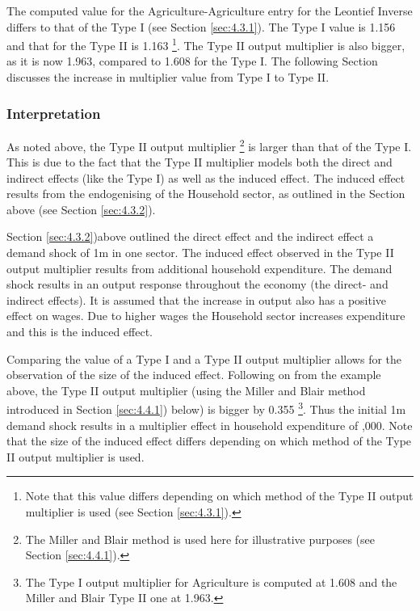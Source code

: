\begin{doublespacing}
\bigskip

The computed value for the Agriculture-Agriculture entry for the Leontief Inverse differs to that of the Type I (see Section \ref{sec:4.3.1}). The Type I value is 1.156 and that for the Type II is 1.163 \footnote{ Note that this value differs depending on which method of the Type II output multiplier is used (see Section \ref{sec:4.3.1}).}. The Type II output multiplier is also bigger, as it is now 1.963, compared to 1.608 for the Type I. The following Section discusses the increase in multiplier value from Type I to Type II.

\subsubsection{Interpretation}

As noted above, the Type II output multiplier \footnote{ The Miller and Blair  method is used here for illustrative purposes (see Section \ref{sec:4.4.1}).} is larger than that of the Type I. This is due to the fact that the Type II multiplier models both the direct and indirect effects (like the Type I) as well as the induced effect. The induced effect results from the endogenising of the Household sector, as outlined in the Section above (see Section \ref{sec:4.3.2}).

\bigskip

Section \ref{sec:4.3.2})above outlined the direct effect and the indirect effect a demand shock of \textsterling1m in one sector. The induced effect observed in the Type II output multiplier results from additional household expenditure. The demand shock results in an output response throughout the economy (the direct- and indirect effects). It is assumed that the increase in output also has a positive effect on wages. Due to higher wages the Household sector increases expenditure and this is the induced effect.

\bigskip

Comparing the value of a Type I and a Type II output multiplier allows for the observation of the size of the induced effect. Following on from the example above, the Type II output multiplier (using the Miller and Blair  method introduced in Section \ref{sec:4.4.1}) below) is bigger by 0.355 \footnote{ The Type I output multiplier for Agriculture is computed at 1.608 and the Miller and Blair  Type II one at 1.963.}. Thus the initial \textsterling1m demand shock results in a multiplier effect in household expenditure of ,000. Note that the size of the induced effect differs depending on which method of the Type II output multiplier is used.


\end{doublespacing}
